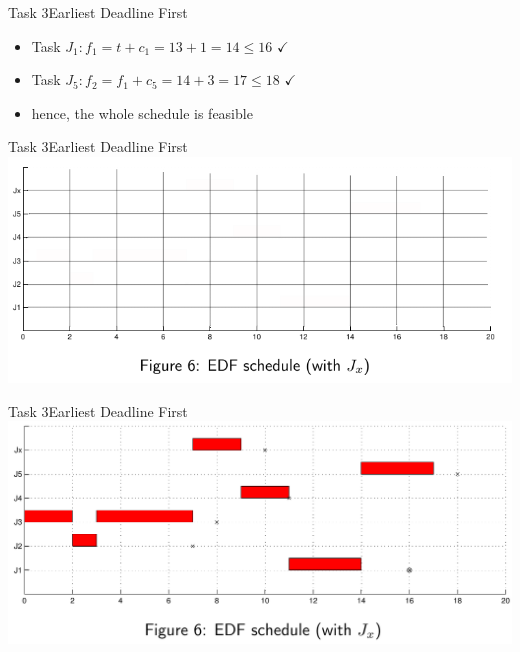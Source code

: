 \begin{frame}[allowframebreaks]{Task 3}{Earliest Deadline First\vspace{0.5cm}}
\begin{itemize}
\begin{itemize}
      \item Task $J_1: f_1=t+c_1=13+1=14 \leq 16$ $\checkmark$
      \item Task $J_5: f_2=f_1+c_5=14+3=17 \leq 18$ $\checkmark$
      \item hence, the whole \alert{schedule is feasible}
    \end{itemize}
  \end{itemize}
\end{frame}

\begin{frame}{Task 3}{Earliest Deadline First}
  \includegraphics[width=\textwidth]{./figures/3_empty_2.png}
\end{frame}

\begin{frame}{Task 3}{Earliest Deadline First}
  \includegraphics[width=\textwidth]{./figures/3_sol_2.png}
\end{frame}
